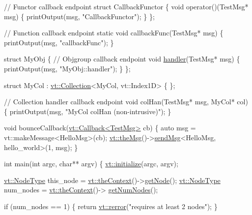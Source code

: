 \begin{DoxyCodeInclude}
\textcolor{comment}{// Functor callback endpoint}
\textcolor{keyword}{struct }CallbackFunctor \{
  \textcolor{keywordtype}{void} operator()(TestMsg* msg) \{
    printOutput(msg, \textcolor{stringliteral}{"CallbackFunctor"});
  \}
\};

\textcolor{comment}{// Function callback endpoint}
\textcolor{keyword}{static} \textcolor{keywordtype}{void} callbackFunc(TestMsg* msg) \{
  printOutput(msg, \textcolor{stringliteral}{"callbackFunc"});
\}

\textcolor{keyword}{struct }MyObj \{
  \textcolor{comment}{// Objgroup callback endpoint}
  \textcolor{keywordtype}{void} \hyperlink{namespacevt_1_1config_a6bd1d6215bda0d8ca02811798399f689a82a0081a94d5c5dfd18b0b3f7eca64b7}{handler}(TestMsg* msg) \{
    printOutput(msg, \textcolor{stringliteral}{"MyObj::handler"});
  \}
\};

\textcolor{keyword}{struct }MyCol : \hyperlink{structvt_1_1vrt_1_1collection_1_1_collection}{vt::Collection}<MyCol, vt::Index1D> \{ \};

\textcolor{comment}{// Collection handler callback endpoint}
\textcolor{keywordtype}{void} colHan(TestMsg* msg, MyCol* col) \{
  printOutput(msg, \textcolor{stringliteral}{"MyCol colHan (non-intrusive)"});
\}

\textcolor{keywordtype}{void} bounceCallback(\hyperlink{structvt_1_1pipe_1_1callback_1_1cbunion_1_1_callback_typed}{vt::Callback<TestMsg>} cb) \{
  \textcolor{keyword}{auto} msg = vt::makeMessage<HelloMsg>(cb);
  \hyperlink{namespacevt_aeafd31f866aeb4dc6fc2f6ee97136350}{vt::theMsg}()->\hyperlink{group__preregister_ga0162a39473e7f9b490a79a7983d949ac}{sendMsg}<HelloMsg, hello\_world>(1, msg);
\}

\textcolor{keywordtype}{int} main(\textcolor{keywordtype}{int} argc, \textcolor{keywordtype}{char}** argv) \{
  \hyperlink{namespacevt_aae6ab5af3e11886ce73c4c3ffa008201}{vt::initialize}(argc, argv);

  \hyperlink{namespacevt_a866da9d0efc19c0a1ce79e9e492f47e2}{vt::NodeType} this\_node = \hyperlink{namespacevt_a26551fe0e6e6a1371111df5b12c7e92c}{vt::theContext}()->\hyperlink{structvt_1_1ctx_1_1_context_a0d52c263ce8516546a67443d9a86fa5f}{getNode}();
  \hyperlink{namespacevt_a866da9d0efc19c0a1ce79e9e492f47e2}{vt::NodeType} num\_nodes = \hyperlink{namespacevt_a26551fe0e6e6a1371111df5b12c7e92c}{vt::theContext}()->
      \hyperlink{structvt_1_1ctx_1_1_context_a7f41071aadf6d5fa9e1b6c703c5ff19d}{getNumNodes}();

  \textcolor{keywordflow}{if} (num\_nodes == 1) \{
    \textcolor{keywordflow}{return} \hyperlink{namespacevt_aff96ace008dc847d4c0f44cfa5dfb3a0}{vt::rerror}(\textcolor{stringliteral}{"requires at least 2 nodes"});
  \}


\end{DoxyCodeInclude}
